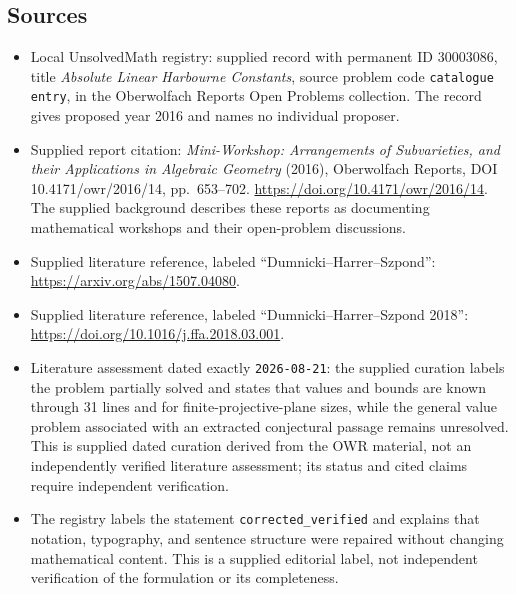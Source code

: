 \documentclass[11pt]{article}
\begin{document}
\subsection{Sources}
\begin{itemize}
\item Local UnsolvedMath registry: supplied record with permanent ID \(30003086\), title \emph{Absolute Linear Harbourne Constants}, source problem code \texttt{catalogue entry}, in the Oberwolfach Reports Open Problems collection. The record gives proposed year 2016 and names no individual proposer.
\item Supplied report citation: \emph{Mini-Workshop: Arrangements of Subvarieties, and their Applications in Algebraic Geometry} (2016), Oberwolfach Reports, DOI 10.4171/owr/2016/14, pp.\ 653--702. \url{https://doi.org/10.4171/owr/2016/14}. The supplied background describes these reports as documenting mathematical workshops and their open-problem discussions.
\item Supplied literature reference, labeled ``Dumnicki--Harrer--Szpond'': \url{https://arxiv.org/abs/1507.04080}.
\item Supplied literature reference, labeled ``Dumnicki--Harrer--Szpond 2018'': \url{https://doi.org/10.1016/j.ffa.2018.03.001}.
\item Literature assessment dated exactly \texttt{2026-08-21}: the supplied curation labels the problem partially solved and states that values and bounds are known through 31 lines and for finite-projective-plane sizes, while the general value problem associated with an extracted conjectural passage remains unresolved. This is supplied dated curation derived from the OWR material, not an independently verified literature assessment; its status and cited claims require independent verification.
\item The registry labels the statement \texttt{corrected\_verified} and explains that notation, typography, and sentence structure were repaired without changing mathematical content. This is a supplied editorial label, not independent verification of the formulation or its completeness.
\end{itemize}
\end{document}
